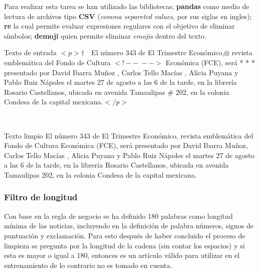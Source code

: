 Para realizar esta tarea se han utilizado las bibliotecas; \textbf{pandas} como medio de lectura de archivos tipo \textbf{CSV} (\textit{comma separeted values}, por sus siglas en ingles); \textbf{re} la cual permite evaluar expresiones regulares con el objetivo de eliminar símbolos; \textbf{demoji} quien permite eliminar \textit{emojis} dentro del texto.\\

\begin{mygraybox}[label={box:cp5:texto}]{Texto de entrada} 
$<p>\dagger$$\ \ \ $ El número 343 de El Trimestre Económico,$\otimes$ revista emblemática del Fondo de Cultura 
$<!--\ -->$
Económica (FCE), será * * * presentado por David Ibarra Muñoz \dSmiley , Carlos Tello Macías \dCooley , Alicia Puyana \dInnocey y Pablo Ruiz Nápoles el martes 27 de agosto a las 6 de la tarde, en la librería Rosario Castellanos, ubicada en avenida Tamaulipas \# 202, en la colonia Condesa de la capital mexicana.$</p>$
\end{mygraybox}

\ \\

\begin{mygraybox}[label={box:cp5:limpio}]{Texto limpio} 
El número 343 de El Trimestre Económico, revista emblemática del Fondo de Cultura 
Económica (FCE), será presentado por David Ibarra Muñoz, Carlos Tello Macías , Alicia Puyana y Pablo Ruiz Nápoles el martes 27 de agosto a las 6 de la tarde, en la librería Rosario Castellanos, ubicada en avenida Tamaulipas 202, en la colonia Condesa de la capital mexicana.
\end{mygraybox}
\subsubsection{Filtro de longitud}

Con base en la regla de negocio  se ha definido 180 palabras como longitud mínima de las noticias, incluyendo en la definición de palabra números, signos de puntuación y exclamación.
Para esto después de haber concluido el proceso de limpieza se pregunta por la longitud de la cadena (sin contar los espacios) y si esta es mayor o igual a 180, entonces es un artículo válido para utilizar en el entrenamiento de lo contrario no es tomado en cuenta.\\


